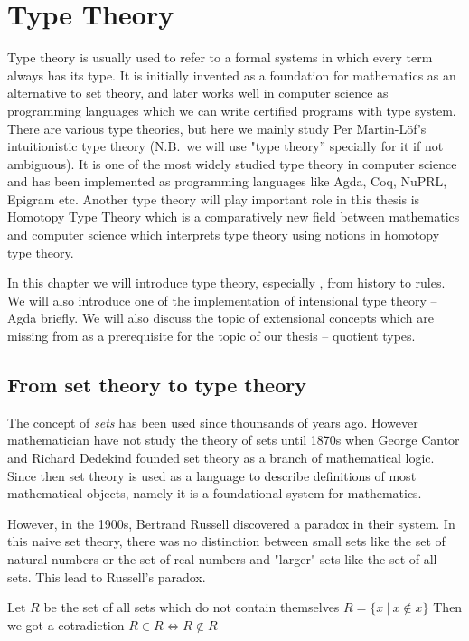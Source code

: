 \chapter{Type Theory}
\label{bg}

Type theory is usually used to refer to a formal systems in which every term always has its type. It is initially invented as a foundation for mathematics as an alternative to set theory, and later works well in computer science as programming languages which we can write certified programs with type system. There are various type theories, but here we mainly study Per Martin-L\"{o}f's intuitionistic type theory (N.B.\ we will use "type theory'' specially for it if not ambiguous). It is one of the most widely studied type theory in computer science and has been implemented as programming languages like Agda, Coq, NuPRL, Epigram etc. Another type theory will play important role in this thesis is Homotopy Type Theory which is a comparatively new field between mathematics and computer science which interprets type theory using notions in homotopy type theory.

In this chapter we will introduce type theory, especially \itt, from history to rules. We will also introduce one of the implementation of intensional type theory -- Agda briefly. We will also discuss the topic of extensional concepts which are missing from \itt as a prerequisite for the topic of our thesis -- quotient types.



\section{From set theory to type theory}

The concept of \emph{sets} has been used since thounsands of years ago. However mathematician have not study the theory of sets until 1870s when George Cantor and Richard Dedekind founded set theory as a branch of mathematical logic. Since then set theory is used as a language to describe definitions of most mathematical objects, namely it is a foundational system for mathematics.



However, in the 1900s, Bertrand Russell discovered a paradox in their system. In this naive set theory, there was no distinction between small sets like the set of natural numbers or the set of real numbers and "larger" sets like the set of all sets. This lead to Russell's paradox.

\begin{example}
Let $R$ be the set of all sets which do not contain themselves
$R = \{x ~| ~x \not\in  x\}$
Then we got a cotradiction
$R \in R \iff R \not\in R$
\end{example}

